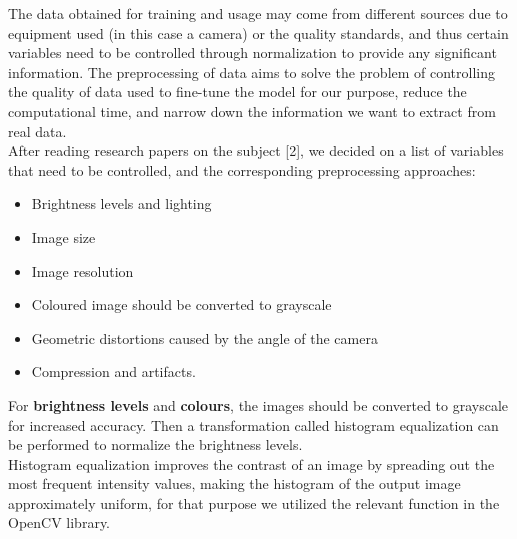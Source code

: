 \documentclass[twoside,a4paper]{article}
\begin{document}
The data obtained for training and usage may come from different sources due to equipment used (in this case a camera) or the quality standards, and thus certain variables need to be controlled through normalization to provide any significant information. The preprocessing of data aims to solve the problem of controlling the quality of data used to fine-tune the model for our purpose, reduce the computational time, and narrow down the information we want to extract from real data.\\
After reading research papers on the subject [2], we decided on a list of variables that need to be controlled, and the corresponding preprocessing approaches:
\begin{itemize}
    \item Brightness levels and lighting
    \item Image size
    \item Image resolution
    \item Coloured image should be converted to grayscale
    \item Geometric distortions caused by the angle of the camera
    \item Compression and artifacts.
\end{itemize}
For \textbf{brightness levels} and \textbf{colours}, the images should be converted to grayscale for increased accuracy. Then a transformation called histogram equalization can be performed to normalize the brightness levels.\\
Histogram equalization improves the contrast of an image by spreading out the most frequent intensity values, making the histogram of the output image approximately uniform, for that purpose we utilized the relevant function in the OpenCV library.~\cite{OpenCV_Histogram_Equalization}\\
\end{document}
